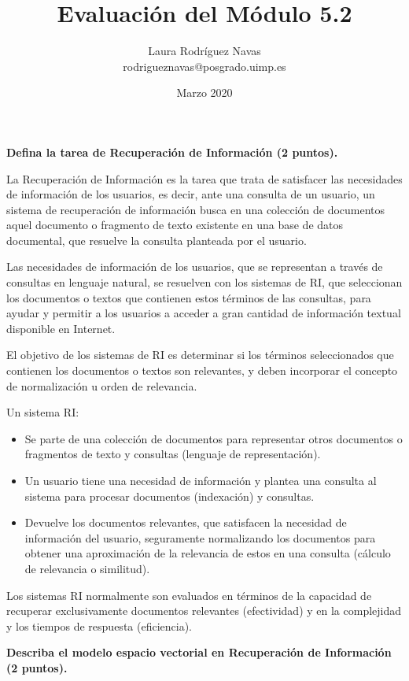 \documentclass[11pt]{exam}
\title{Evaluación del Módulo 5.2}
\author{Laura Rodríguez Navas \\ rodrigueznavas@posgrado.uimp.es}
\date{Marzo 2020}
\begin{document}
	
\maketitle

\begin{questions}

{\bf \question Defina la tarea de Recuperación de Información (2 puntos).}

La Recuperación de Información es la tarea que trata de satisfacer las necesidades de información de los usuarios, es decir, ante una consulta de un usuario, un sistema de recuperación de información busca en una colección de documentos aquel documento o fragmento de texto existente en una base de datos documental, que resuelve la consulta planteada por el usuario. 

Las necesidades de información de los usuarios, que se representan a través de consultas en lenguaje natural, se resuelven con los sistemas de RI, que seleccionan los documentos o textos que contienen estos términos de las consultas, para ayudar y permitir a los usuarios a acceder a gran cantidad de información textual disponible en Internet. 

El objetivo de los sistemas de RI es determinar si los términos seleccionados que contienen los documentos o textos son relevantes, y deben incorporar el concepto de normalización u orden de relevancia. 

Un sistema RI:

\begin{itemize}
	\item Se parte de una colección de documentos para representar otros documentos o fragmentos de texto y consultas (lenguaje de representación).
	\item Un usuario tiene una necesidad de información y plantea una consulta al sistema para procesar documentos (indexación) y consultas.
	\item Devuelve los documentos relevantes, que satisfacen la necesidad de información del usuario, seguramente normalizando los documentos para obtener una aproximación de la relevancia de estos en una consulta (cálculo de relevancia o similitud).
\end{itemize}

Los sistemas RI normalmente son evaluados en términos de la capacidad de recuperar exclusivamente documentos relevantes (efectividad) y en la complejidad y los tiempos de respuesta (eficiencia).

{\bf \question Describa el modelo espacio vectorial en Recuperación de Información (2 puntos).}


\end{questions}
\end{document}
